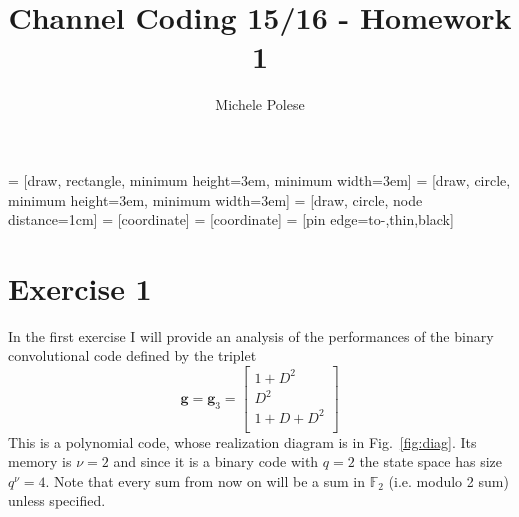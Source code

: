 \documentclass[10pt]{article}
\begin{document}
\title{Channel Coding 15/16 - Homework 1}
\author{Michele Polese}

\maketitle

 = [draw, rectangle, 
    minimum height=3em, minimum width=3em]
 = [draw, circle, minimum height=3em, minimum width=3em]
 = [draw, circle, node distance=1cm]
 = [coordinate]
 = [coordinate]
 = [pin edge={to-,thin,black}]


\section*{Exercise 1}
In the first exercise I will provide an analysis of the performances of the binary convolutional code defined by the triplet 
\begin{equation}
	\mathbf{g} = \mathbf{g}_3 = \begin{bmatrix}
			1 + D^2 \\
			D^2	\\
			1 + D + D^2 \\
			\end{bmatrix}
\end{equation}
This is a polynomial code, whose realization diagram is in Fig.~\ref{fig:diag}. Its memory is $\nu = 2$ and since it is a binary code with $q = 2$ the state space has size $q^\nu = 4$. Note that every sum from now on will be a sum in $\mathbb{F}_2$ (i.e. modulo 2 sum) unless specified.
\end{document}
